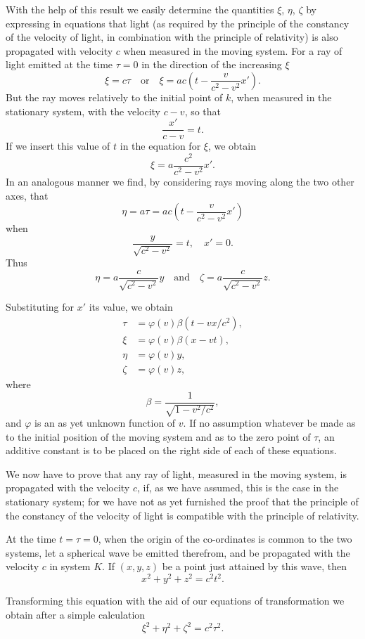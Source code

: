 With the help of this result we easily determine the quantities $\xi$, $\eta$, $\zeta$ by expressing in equations that light (as required by the principle of the constancy of the velocity of light, in combination with the principle of relativity) is also propagated with velocity $c$ when measured in the moving system. For a ray of light emitted at the time $\tau = 0$ in the direction of the increasing $\xi$ $$ \xi = c\tau \quad\text{or}\quad \xi = ac\left( t - \frac{v}{c^2 - v^2} x' \right) .$$ But the ray moves relatively to the initial point of $k$, when measured in the stationary system, with the velocity $c-v$, so that $$ \frac{x'}{c-v} = t .$$ If we insert this value of $t$ in the equation for $\xi$, we obtain $$ \xi = a\frac{c^2}{c^2 - v^2}x' .$$ In an analogous manner we find, by considering rays moving along the two other axes, that $$ \eta = a\tau = ac\left( t - \frac{v}{c^2 - v^2} x' \right) $$ when $$ \frac{y}{\sqrt{c^2 - v^2}} = t ,\quad x' = 0 .$$ Thus $$ \eta = a\frac{c}{\sqrt{c^2 - v^2}}y \quad\text{and}\quad \zeta = a\frac{c}{\sqrt{c^2 - v^2}}z .$$ 

Substituting for $x'$ its value, we obtain
\begin{align*}
	\tau &= \varphi(v)\beta(t - vx/c^2), \\
	\xi &= \varphi(v)\beta(x - vt), \\
	\eta &= \varphi(v)y, \\
	\zeta &= \varphi(v)z,
\end{align*}
where $$\beta = \frac{1}{\sqrt{1 - v^2/c^2}} ,$$ and $\varphi$ is an as yet unknown function of $v$. If no assumption whatever be made as to the initial position of the moving system and as to the zero point of $\tau$, an additive constant is to be placed on the right side of each of these equations.

We now have to prove that any ray of light, measured in the moving system, is propagated with the velocity $c$, if, as we have assumed, this is the case in the stationary system; for we have not as yet furnished the proof that the principle of the constancy of the velocity of light is compatible with the principle of relativity.

At the time $t = \tau = 0$, when the origin of the co-ordinates is common to the two systems, let a spherical wave be emitted therefrom, and be propagated with the velocity $c$ in system $K$. If $(x, y, z)$ be a point just attained by this wave, then $$ x^2 + y^2 + z^2 = c^2 t^2 .$$

Transforming this equation with the aid of our equations of transformation we obtain after a simple calculation $$ \xi^2 + \eta^2 + \zeta^2 = c^2 \tau^2 .$$

